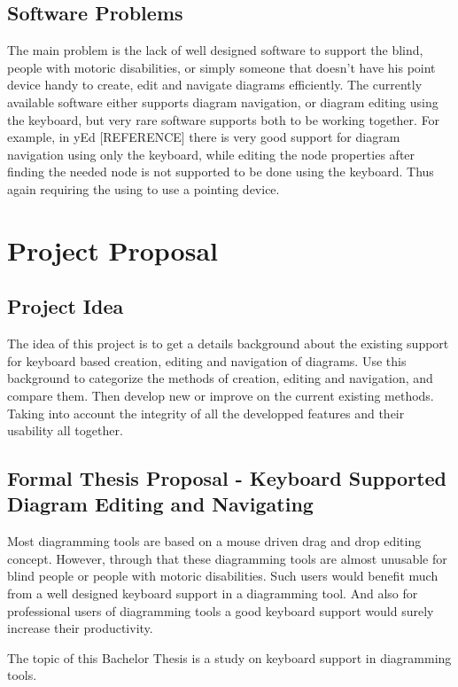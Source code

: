 \subsection{Software Problems}
The main problem is the lack of well designed software to support the blind, people with motoric disabilities, or simply someone that doesn't have his point device handy to create, edit and navigate diagrams efficiently.
The currently available software either supports diagram navigation, or diagram editing using the keyboard, but very rare software supports both to be working together. For example, in yEd [REFERENCE] there is very good support for diagram navigation using only the keyboard, while editing the node properties after finding the needed node is not supported to be done using the keyboard. Thus again requiring the using to use a pointing device.

\section{Project Proposal}
\subsection{Project Idea}
The idea of this project is to get a details background about the existing support for keyboard based creation, editing and navigation of diagrams. Use this background to categorize the methods of creation, editing and navigation, and compare them. Then develop new or improve on the current existing methods. Taking into account the integrity of all the developped features and their usability all together.

\subsection{Formal Thesis Proposal - Keyboard Supported Diagram Editing and Navigating}
Most diagramming tools are based on a mouse driven drag and drop editing concept. However, through that these diagramming tools are almost unusable for blind people or people with motoric disabilities. Such users would benefit much from a well designed keyboard support in a diagramming tool. And also for professional users of diagramming tools a good keyboard support would surely increase their productivity.

\par \noindent
The topic of this Bachelor Thesis is a study on keyboard support in diagramming tools.

